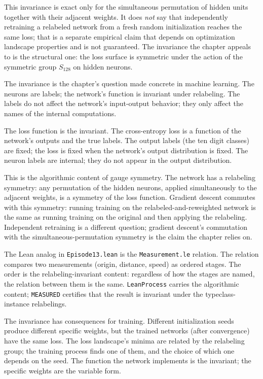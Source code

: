 This invariance is exact only for the simultaneous permutation of
hidden units together with their adjacent weights. It does
\emph{not} say that independently retraining a relabeled network
from a fresh random initialization reaches the same loss; that is
a separate empirical claim that depends on optimization landscape
properties and is not guaranteed. The invariance the chapter
appeals to is the structural one: the loss surface is symmetric
under the action of the symmetric group $S_{128}$ on hidden
neurons.

The invariance is the chapter's question made concrete in machine
learning. The neurons are labels; the network's function is
invariant under relabeling. The labels do not affect the
network's input-output behavior; they only affect the names of
the internal computations.

The loss function is the invariant. The cross-entropy loss is a
function of the network's outputs and the true labels. The output
labels (the ten digit classes) are fixed; the loss is fixed when
the network's output distribution is fixed. The neuron labels are
internal; they do not appear in the output distribution.

This is the algorithmic content of gauge symmetry. The network has
a relabeling symmetry: any permutation of the hidden neurons,
applied simultaneously to the adjacent weights, is a symmetry of
the loss function. Gradient descent commutes with this symmetry:
running training on the relabeled-and-reweighted network is the
same as running training on the original and then applying the
relabeling. Independent retraining is a different question;
gradient descent's commutation with the simultaneous-permutation
symmetry is the claim the chapter relies on.

The Lean analog in \texttt{Episode13.lean} is the
\texttt{Measurement.le} relation. The relation compares two
measurements (origin, distance, speed) as ordered stages. The
order is the relabeling-invariant content: regardless of how the
stages are named, the relation between them is the same.
\texttt{LeanProcess} carries the algorithmic content;
\texttt{MEASURED} certifies that the result is invariant under
the typeclass-instance relabelings.

The invariance has consequences for training. Different
initialization seeds produce different specific weights, but the
trained networks (after convergence) have the same loss. The loss
landscape's minima are related by the relabeling group; the
training process finds one of them, and the choice of which one
depends on the seed. The function the network implements is the
invariant; the specific weights are the variable form.

